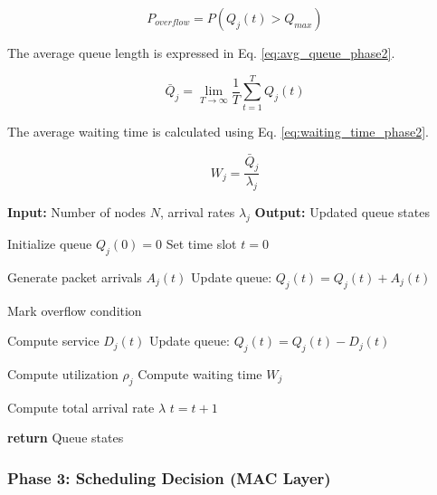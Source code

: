 \documentclass[a4paper,fleqn]{cas-dc}
\numberwithin{equation}{section}
\begin{document}
\begin{equation}
P_{overflow} = P(Q_j(t) > Q_{max})
\label{eq:overflow_phase2}
\end{equation}

The average queue length is expressed in Eq. \ref{eq:avg_queue_phase2}.

\begin{equation}
\bar{Q}_j = \lim_{T \to \infty} \frac{1}{T} \sum_{t=1}^{T} Q_j(t)
\label{eq:avg_queue_phase2}
\end{equation}

The average waiting time is calculated using Eq. \ref{eq:waiting_time_phase2}.

\begin{equation}
W_j = \frac{\bar{Q}_j}{\lambda_j}
\label{eq:waiting_time_phase2}
\end{equation}

\begin{algorithm}
\caption{Phase 2: Traffic Arrival and Queue Formation}
\begin{algorithmic}

\STATE \textbf{Input:} Number of nodes $N$, arrival rates $\lambda_j$
\STATE \textbf{Output:} Updated queue states

\STATE Initialize queue $Q_j(0) = 0$
\STATE Set time slot $t = 0$


        \STATE Generate packet arrivals $A_j(t)$
        \STATE Update queue: $Q_j(t) = Q_j(t) + A_j(t)$
        
            \STATE Mark overflow condition
        \ENDIF
        
            \STATE Compute service $D_j(t)$
            \STATE Update queue: $Q_j(t) = Q_j(t) - D_j(t)$
        \ENDIF
        
        \STATE Compute utilization $\rho_j$
        \STATE Compute waiting time $W_j$
    \ENDFOR

    \STATE Compute total arrival rate $\lambda$
    \STATE $t = t + 1$

\ENDWHILE

\STATE \textbf{return} Queue states

\end{algorithmic}
\end{algorithm}


\subsubsection{Phase 3: Scheduling Decision (MAC Layer)}
\end{document}
